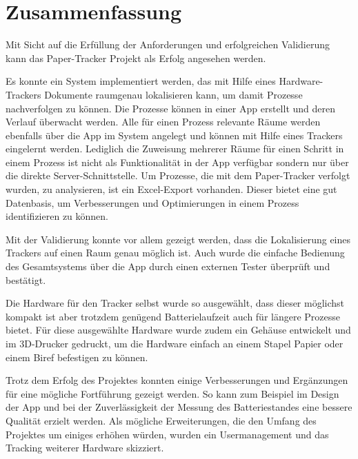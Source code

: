\chapter{Zusammenfassung}

Mit Sicht auf die Erfüllung der Anforderungen und erfolgreichen Validierung kann das Paper-Tracker Projekt als
Erfolg angesehen werden.

Es konnte ein System implementiert werden, das mit Hilfe eines Hardware-Trackers Dokumente
raumgenau lokalisieren kann, um damit Prozesse nachverfolgen zu können.
Die Prozesse können in einer App erstellt und deren Verlauf überwacht werden.
Alle für einen Prozess relevante Räume werden ebenfalls über die App im System angelegt und können mit Hilfe eines
Trackers eingelernt werden.
Lediglich die Zuweisung mehrerer Räume für einen Schritt in einem Prozess ist nicht als Funktionalität in der App
verfügbar sondern nur über die direkte Server-Schnittstelle.
Um Prozesse, die mit dem Paper-Tracker verfolgt wurden, zu analysieren, ist ein Excel-Export vorhanden.
Dieser bietet eine gut Datenbasis, um Verbesserungen und Optimierungen in einem Prozess identifizieren zu können.

Mit der Validierung konnte vor allem gezeigt werden, dass die Lokalisierung eines Trackers auf einen Raum genau möglich ist.
Auch wurde die einfache Bedienung des Gesamtsystems über die App durch einen externen Tester überprüft und bestätigt.

Die Hardware für den Tracker selbst wurde so ausgewählt, dass dieser möglichst kompakt ist aber trotzdem genügend
Batterielaufzeit auch für längere Prozesse bietet.
Für diese ausgewählte Hardware wurde zudem ein Gehäuse entwickelt und im 3D-Drucker gedruckt, um die Hardware
einfach an einem Stapel Papier oder einem Biref befestigen zu können.

Trotz dem Erfolg des Projektes konnten einige Verbesserungen und Ergänzungen für eine mögliche Fortführung gezeigt werden.
So kann zum Beispiel im Design der App und bei der Zuverlässigkeit der Messung des Batteriestandes eine bessere Qualität erzielt werden.
Als mögliche Erweiterungen, die den Umfang des Projektes um einiges erhöhen würden, wurden ein Usermanagement und das Tracking weiterer Hardware skizziert.
